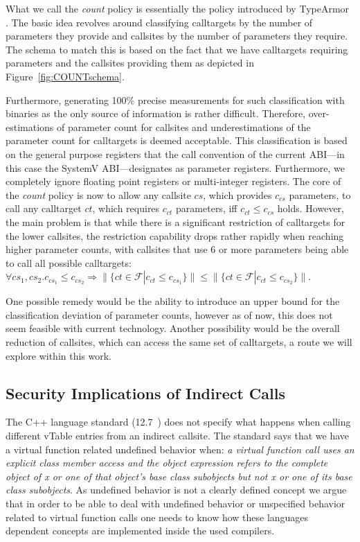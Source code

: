 What we call the \emph{count} policy is essentially the policy introduced by TypeArmor \cite{veen:typearmor}. 
The basic idea revolves around classifying calltargets by the number of parameters they provide and callsites 
by the number of parameters they require. The schema to match this is based on the fact that we  
have calltargets requiring parameters and the callsites providing them as depicted in Figure~\ref{fig:COUNTschema}.

Furthermore, generating 100\% precise measurements for such classification with binaries as the only source of information is rather difficult. 
Therefore, over-estimations of parameter count for callsites and underestimations of the parameter count for calltargets is deemed acceptable. 
This classification is based on the general purpose registers that the call convention of the current ABI---in this case the 
SystemV ABI---designates as parameter registers. Furthermore, we completely ignore floating point registers or multi-integer registers. 
The core of the \emph{count} policy is now to allow any callsite $cs$, which provides $c_{cs}$ parameters, to call any calltarget $ct$, 
which requires $c_{ct}$ parameters, iff $c_{ct} \leq c_{cs}$ holds. However, the main problem is that while there is a significant 
restriction of calltargets for the lower callsites, the restriction capability drops rather rapidly when reaching higher parameter 
counts, with callsites that use 6 or more parameters being able to call all possible calltargets:
$\forall cs_1, cs_2.  c_{cs_1} \leq c_{cs_2} \Longrightarrow  \| \{ct \in \mathcal{F} | c_{ct} \leq c_{cs_1} \} \| \leq \| \{ct \in \mathcal{F} | c_{ct} \leq c_{cs_2}  \} \|$.

One possible remedy would be the ability to introduce an upper bound for the classification deviation of parameter counts, 
however as of now, this does not seem feasible with current technology. Another possibility would be the overall reduction
of callsites, which can access the same set of calltargets, a route we will explore within this work.

\subsection{Security Implications of Indirect Calls}
\label{Security Implications of Forbidden Forward Indirect Calls}
The C++ language standard (12.7~\cite{iso:iecN3690}) does not specify
what happens when calling different vTable entries from an indirect callsite.
The standard says that we have a virtual function related undefined behavior when:
\textit{a virtual function call uses an explicit class member access and the object expression refers to the complete
object of x or one of that object’s base class subobjects but not x or one of its base class subobjects}.
As undefined behavior is not a clearly defined concept we argue that in order to be able to deal
with undefined behavior or  unspecified behavior related to virtual function calls one needs to know
how these languages dependent concepts are implemented inside the used compilers.

